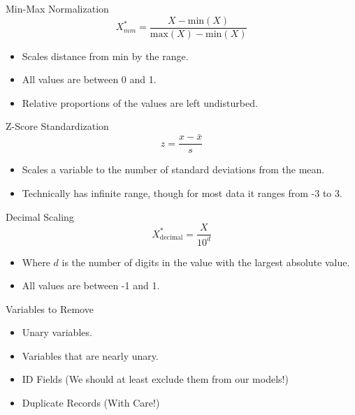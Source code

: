 \documentclass[handout]{beamer}
\begin{document}
\begin{frame}{Min-Max Normalization}
\[
X^*_{mm} = \displaystyle\frac{X - \mathrm{min}(X)}{\mathrm{max}(X) - \mathrm{min}(X)}
\]
\begin{itemize}[<+->]
\item Scales distance from min by the range.
\item All values are between 0 and 1.
\item Relative proportions of the values are left undisturbed.
\end{itemize}
\end{frame}

\begin{frame}{Z-Score Standardization}
\[
z = \displaystyle\frac{x-\bar{x}}{s}
\]
\begin{itemize}[<+->]
  \item Scales a variable to the number of standard deviations from the mean.
  \item Technically has infinite range, though for most data it ranges from -3 to 3.
\end{itemize}
\end{frame}

\begin{frame}{Decimal Scaling}
\[
X^*_{\mathrm{decimal}} = \displaystyle\frac{X}{10^d}
\]

\begin{itemize}[<+->]
  \item Where $d$ is the number of digits in the value with the largest absolute value.
  \item All values are between -1 and 1.
\end{itemize}
\end{frame}

\begin{frame}{Variables to Remove}
  \begin{itemize}[<+->]
    \item Unary variables.
    \item Variables that are nearly unary.
    \item ID Fields (We should at least exclude them from our models!)
    \item Duplicate Records (With Care!)
  \end{itemize}
\end{frame}
\end{document}
